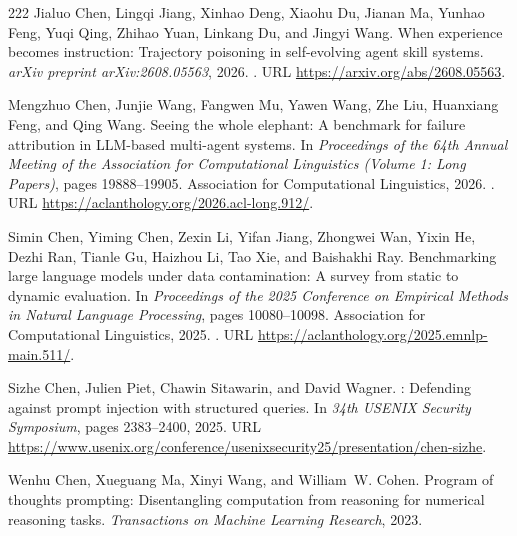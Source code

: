 \begin{thebibliography}{222}
Jialuo Chen, Lingqi Jiang, Xinhao Deng, Xiaohu Du, Jianan Ma, Yunhao Feng, Yuqi
  Qing, Zhihao Yuan, Linkang Du, and Jingyi Wang.
\newblock When experience becomes instruction: Trajectory poisoning in
  self-evolving agent skill systems.
\newblock \emph{arXiv preprint arXiv:2608.05563}, 2026{}.
\newblock {}.
\newblock URL \url{https://arxiv.org/abs/2608.05563}.

Mengzhuo Chen, Junjie Wang, Fangwen Mu, Yawen Wang, Zhe Liu, Huanxiang Feng,
  and Qing Wang.
\newblock Seeing the whole elephant: A benchmark for failure attribution in
  {LLM}-based multi-agent systems.
\newblock In \emph{Proceedings of the 64th Annual Meeting of the Association
  for Computational Linguistics (Volume 1: Long Papers)}, pages 19888--19905.
  Association for Computational Linguistics, 2026{}.
\newblock {}.
\newblock URL \url{https://aclanthology.org/2026.acl-long.912/}.

Simin Chen, Yiming Chen, Zexin Li, Yifan Jiang, Zhongwei Wan, Yixin He, Dezhi
  Ran, Tianle Gu, Haizhou Li, Tao Xie, and Baishakhi Ray.
\newblock Benchmarking large language models under data contamination: A survey
  from static to dynamic evaluation.
\newblock In \emph{Proceedings of the 2025 Conference on Empirical Methods in
  Natural Language Processing}, pages 10080--10098. Association for
  Computational Linguistics, 2025{}.
\newblock {}.
\newblock URL \url{https://aclanthology.org/2025.emnlp-main.511/}.

Sizhe Chen, Julien Piet, Chawin Sitawarin, and David Wagner.
: Defending against prompt injection with structured queries.
\newblock In \emph{34th USENIX Security Symposium}, pages 2383--2400,
  2025{}.
\newblock URL
  \url{https://www.usenix.org/conference/usenixsecurity25/presentation/chen-sizhe}.

Wenhu Chen, Xueguang Ma, Xinyi Wang, and William~W. Cohen.
\newblock Program of thoughts prompting: Disentangling computation from
  reasoning for numerical reasoning tasks.
\newblock \emph{Transactions on Machine Learning Research}, 2023.


\end{thebibliography}
